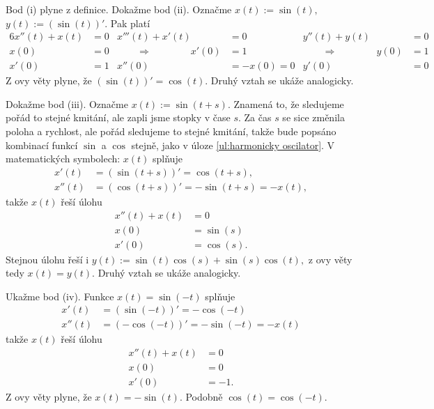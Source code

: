 \begin{důkaz}
  Bod (i) plyne z definice. Dokažme bod (ii). Označme $x(t):= \sin(t),$ $y(t):=(\sin(t))'.$ Pak platí
  \begin{alignat*}{6}
	  x''(t)+x(t) &= 0 &                                         x'''(t)+x'(t) &= 0 &                                                y''(t)+y(t) &= 0 \\
	  x(0)        &= 0 & \hspace{2em} \Longrightarrow \hspace{4em}       x'(0) &= 1 \quad & \hspace{2em} \Longrightarrow \hspace{4em}       y(0) &= 1 \\
	  x'(0)       &= 1 & 		                                    x''(0) &= -x(0)=0& 		                                       y'(0) &= 0
  \end{alignat*}
Z \PL ovy věty plyne, že $(\sin(t))'=\cos(t).$ Druhý vztah se ukáže analogicky.

Dokažme bod (iii). Označme $x(t):=\sin(t+s).$ Znamená to, že sledujeme pořád to stejné kmitání, ale zapli jsme stopky v čase $s$. Za čas $s$ se sice změnila poloha a rychlost, ale pořád sledujeme to stejné kmitání, takže bude popsáno kombinací funkcí $\sin$ a $\cos$ stejně, jako v úloze \ref{ul:harmonicky oscilator}. V matematických symbolech: $x(t)$ splňuje
\begin{align*}
	x'(t)&=(\sin(t+s))'=\cos(t+s), \\
	x''(t)&=(\cos(t+s))'=-\sin(t+s)=-x(t),
\end{align*}
takže $x(t)$ řeší úlohu
\begin{align*}
	x''(t)+x(t)&=0 \\
	x(0)&=\sin(s) \\
	x'(0)&=\cos(s).
\end{align*}
Stejnou úlohu řeší i $y(t):=\sin(t)\cos(s)+\sin(s)\cos(t),$ z \PL ovy věty tedy $x(t)=y(t).$ Druhý vztah se ukáže analogicky. 

Ukažme bod (iv). Funkce $x(t)=\sin(-t)$ splňuje
\begin{align*}
	x'(t) &= (\sin(-t))'=-\cos(-t) \\
	x''(t) &= (-\cos(-t))'=-\sin(-t)=-x(t)
\end{align*}
takže $x(t)$ řeší úlohu
\begin{align*}
	x''(t)+x(t) &= 0 \\
	x(0) &= 0 \\
	x'(0) &= -1.
\end{align*}
Z \PL ovy věty plyne, že $x(t)=-\sin(t).$ Podobně $\cos(t)=\cos(-t).$


\end{důkaz}
